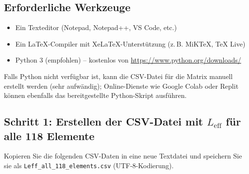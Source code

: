 \documentclass[11pt,a4paper]{article}
\begin{document}
	\subsection*{Erforderliche Werkzeuge}
	\begin{itemize}
		\item Ein Texteditor (Notepad, Notepad++, VS Code, etc.)
		\item Ein LaTeX-Compiler mit XeLaTeX-Unterstützung (z. B. MiKTeX, TeX Live)
		\item Python 3 (empfohlen) – kostenlos von \url{https://www.python.org/downloads/}
	\end{itemize}
	Falls Python nicht verfügbar ist, kann die CSV-Datei für die Matrix manuell erstellt werden (sehr aufwändig); Online-Dienste wie Google Colab oder Replit können ebenfalls das bereitgestellte Python-Skript ausführen.
	
	\subsection*{Schritt 1: Erstellen der CSV-Datei mit \(L_{\mathrm{eff}}\) für alle 118 Elemente}
	Kopieren Sie die folgenden CSV-Daten in eine neue Textdatei und speichern Sie sie als \texttt{Leff\_all\_118\_elements.csv} (UTF-8-Kodierung).
	
\end{document}
